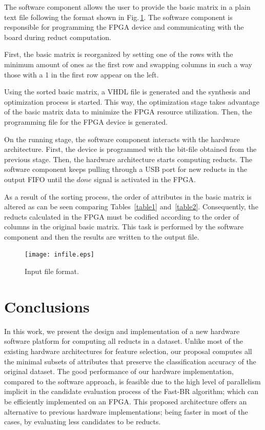 \documentclass[authoryear,preprint,review,12pt]{elsarticle}
\begin{document}
The software component allows the user to provide the basic matrix in a 
plain text file following the format shown in Fig.\,\ref{fig:8}. The software component is responsible for 
programming the FPGA device and communicating with the board during reduct computation.

First, the basic matrix is reorganized by setting one of the rows with the minimum amount of ones as the 
first row and swapping columns in such a way those with a 1 in the first row appear on the left. 

Using the sorted basic matrix, a VHDL file is generated and the synthesis and optimization process is started.
This way, the optimization stage takes advantage of the basic matrix data to minimize the FPGA resource 
utilization. Then, the programming file for the FPGA device is generated.

On the running stage, the software component interacts with the hardware architecture. 
First, the device is programmed with the bit-file obtained from the previous stage. Then, the
hardware architecture starts computing reducts. 
The software component keeps pulling through a USB port for new reducts in the output 
FIFO until the $done$ signal is activated in the FPGA.

As a result of the sorting process, the order of attributes in the basic matrix is altered as can 
be seen comparing Tables~\ref{table1} and~\ref{table2}. Consequently, the reducts calculated 
in the FPGA must be codified according to the order of columns in the original basic matrix. This task 
is performed by the software component and then the results are written to the output file.

\begin{figure}[t]
    \begin{center}
       \texttt{[image: infile.eps]}
    \end{center}
\caption{Input file format.}
\label{fig:8}
\end{figure}


\section{Conclusions}
\label{sect:8}
In this work, we present the design and implementation of a new hardware software platform for
computing all reducts in a dataset.  Unlike most of the existing hardware 
architectures for feature selection, our proposal computes all the
minimal subsets of attributes that preserve the classification accuracy of the original dataset.
The good performance of our hardware implementation, compared to the software approach, is 
feasible due to the high level of parallelism implicit in the candidate evaluation process of 
the Fast-BR algorithm; which can be efficiently implemented on an FPGA. 
This proposed architecture offers an alternative to previous hardware implementations; being 
faster in most of the cases, by evaluating less candidates to be reducts. 
 
\end{document}
